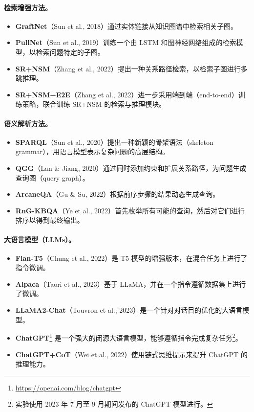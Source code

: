 \documentclass[11pt,UTF8,fontset=fandol]{ctexart}
\begin{document}
\paragraph{检索增强方法。}
\begin{itemize}[leftmargin=2em]
\item \textbf{GraftNet}（Sun et al., 2018）通过实体链接从知识图谱中检索相关子图。
\item \textbf{PullNet}（Sun et al., 2019）训练一个由 LSTM 和图神经网络组成的检索模型，以检索问题特定的子图。
\item \textbf{SR+NSM}（Zhang et al., 2022）提出一种关系路径检索，以检索子图进行多跳推理。
\item \textbf{SR+NSM+E2E}（Zhang et al., 2022）进一步采用端到端（end-to-end）训练策略，联合训练 SR+NSM 的检索与推理模块。
\end{itemize}

\paragraph{语义解析方法。}
\begin{itemize}[leftmargin=2em]
\item \textbf{SPARQL}（Sun et al., 2020）提出一种新颖的骨架语法（skeleton grammar），用语言模型表示复杂问题的高层结构。
\item \textbf{QGG}（Lan \& Jiang, 2020）通过同时添加约束和扩展关系路径，为问题生成查询图（query graph）。
\item \textbf{ArcaneQA}（Gu \& Su, 2022）根据前序步骤的结果动态生成查询。
\item \textbf{RnG-KBQA}（Ye et al., 2022）首先枚举所有可能的查询，然后对它们进行排序以得到最终输出。
\end{itemize}

\paragraph{大语言模型（LLMs）。}
\begin{itemize}[leftmargin=2em]
\item \textbf{Flan-T5}（Chung et al., 2022）是 T5 模型的增强版本，在混合任务上进行了指令微调。
\item \textbf{Alpaca}（Taori et al., 2023）基于 LLaMA，并在一个指令遵循数据集上进行了微调。
\item \textbf{LLaMA2-Chat}（Touvron et al., 2023）是一个针对对话目的优化的大语言模型。
\item \textbf{ChatGPT}\footnote{\url{https://openai.com/blog/chatgpt}} 是一个强大的闭源大语言模型，能够遵循指令完成复杂任务\footnote{实验使用 2023 年 7 月至 9 月期间发布的 ChatGPT 模型进行。}。
\item \textbf{ChatGPT+CoT}（Wei et al., 2022）使用链式思维提示来提升 ChatGPT 的推理能力。
\end{itemize}
\end{document}
